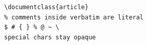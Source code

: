 \begin{verbatim}
\documentclass{article}
% comments inside verbatim are literal
$ # { } % @ ~ \
special chars stay opaque
\end{verbatim}
